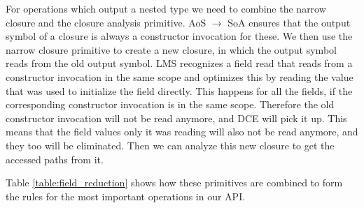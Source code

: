 For  operations which output a nested type we need to combine the narrow closure and the closure analysis primitive. AoS $\rightarrow$ SoA ensures that the output symbol of a closure is always a constructor invocation for these. We then use the narrow closure primitive to create a new closure, in which the output symbol reads from the old output symbol. LMS recognizes a field read that reads from a constructor invocation in the same scope and optimizes this by reading the value that was used to initialize the field directly. This happens for all the fields, if the corresponding constructor invocation is in the same scope. Therefore the old constructor invocation will not be read anymore, and DCE will pick it up. This means that the field values only it was reading will also not be read anymore, and they too will be eliminated. Then we can analyze this new closure to get the accessed paths from it. 

 Table \ref{table:field_reduction} shows how these primitives are combined to form the rules for the most important operations in our API.

 
